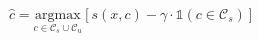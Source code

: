 \begin{equation}
\label{eq:calibrated-inference}
\widehat{c}=\underset{c\in {\mathcal{C}}_{s}\cup {\mathcal{C}}_{u}}{\mathrm{argmax}}\left[ s(x,c)-\gamma \cdot \mathbb{1}\left( c\in {\mathcal{C}}_{s}\right) \right] 
\end{equation}
